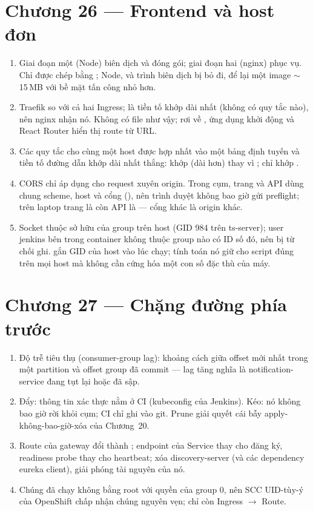 \section*{Chương 26 --- Frontend và host đơn}
\begin{enumerate}
  \item Giai đoạn một (Node) biên dịch và đóng gói; giai đoạn hai (nginx)
  phục vụ. Chỉ  được chép bằng ;
  Node,  và trình biên dịch bị bỏ đi, để lại một
  image $\sim$15\,MB với bề mặt tấn công nhỏ hơn.
  \item Traefik so  với cả hai Ingress; \code{/} là
  tiền tố khớp dài nhất (không có quy tắc  nào), nên
  nginx nhận nó. Không có file như vậy;
   rơi về
  , ứng dụng khởi động và React Router hiển thị route
  từ URL.
  \item Các quy tắc cho cùng một host được hợp nhất vào một bảng định
  tuyến và tiền tố đường dẫn khớp dài nhất thắng: 
  khớp  (dài hơn) thay vì \code{/};  chỉ
  khớp \code{/}.
  \item CORS chỉ áp dụng cho request xuyên origin. Trong cụm, trang và
  API dùng chung scheme, host và cổng (), nên
  trình duyệt không bao giờ gửi preflight; trên laptop trang là
   còn API là  --- cổng khác
  là origin khác.
  \item Socket thuộc sở hữu của group  trên host (GID 984
  trên ts-server); user jenkins bên trong container không thuộc group
  nào có ID số đó, nên bị từ chối ghi.  gắn GID của
  host vào lúc chạy; tính toán nó giữ cho script đúng trên mọi host mà
  không cần cứng hóa một con số đặc thù của máy.
\end{enumerate}

\section*{Chương 27 --- Chặng đường phía trước}
\begin{enumerate}
  \item Độ trễ tiêu thụ (consumer-group lag): khoảng cách giữa offset
  mới nhất trong một partition và offset group đã commit --- lag tăng
  nghĩa là notification-service đang tụt lại hoặc đã sập.
  \item Đẩy: thông tin xác thực nằm ở CI (kubeconfig của Jenkins). Kéo:
  nó không bao giờ rời khỏi cụm; CI chỉ ghi vào git. Prune giải quyết
  cái bẫy apply-không-bao-giờ-xóa của Chương~20.
  \item Route của gateway đổi  thành
  ; endpoint của Service thay cho đăng ký,
  readiness probe thay cho heartbeat; xóa discovery-server (và các
  dependency eureka client), giải phóng tài nguyên của nó.
  \item Chúng đã chạy không bằng root với quyền của group 0, nên SCC
  UID-tùy-ý của OpenShift chấp nhận chúng nguyên vẹn; chỉ còn
  Ingress $\rightarrow$ Route.
\end{enumerate}

